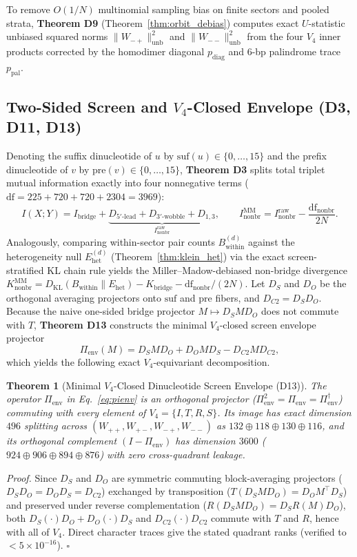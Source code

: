 \documentclass[11pt,a4paper]{article}
\newtheorem{theorem}{Theorem}
\newcommand{\Wpp}{W_{++}}
\newcommand{\Wpm}{W_{+-}}
\newcommand{\Wmp}{W_{-+}}
\newcommand{\Wmm}{W_{--}}
\newcommand{\Pienv}{\Pi_{\mathrm{env}}}
\newcommand{\Inb}{I_{\mathrm{nonbr}}^{\mathrm{MM}}}
\newcommand{\Inbraw}{I_{\mathrm{nonbr}}^{\mathrm{raw}}}
\begin{document}
\noindent To remove $O(1/N)$ multinomial sampling bias on finite sectors and pooled strata, \textbf{Theorem D9} (Theorem~\ref{thm:orbit_debias}) computes exact $U$-statistic unbiased squared norms $\|\Wmp\|^2_{\mathrm{unb}}$ and $\|\Wmm\|^2_{\mathrm{unb}}$ from the four $V_4$ inner products corrected by the homodimer diagonal $p_{\mathrm{diag}}$ and 6-bp palindrome trace $p_{\mathrm{pal}}$.

\subsection{Two-Sided Screen and $V_4$-Closed Envelope (D3, D11, D13)}
Denoting the suffix dinucleotide of $u$ by $\mathrm{suf}(u) \in \{0,\dots,15\}$ and the prefix dinucleotide of $v$ by $\mathrm{pre}(v) \in \{0,\dots,15\}$, \textbf{Theorem D3} splits total triplet mutual information exactly into four nonnegative terms ($\mathrm{df}=225+720+720+2304=3969$):
\begin{equation}
  I(X;Y) = I_{\mathrm{bridge}} + \underbrace{D_{5'\text{-lead}} + D_{3'\text{-wobble}} + D_{1,3}}_{\Inbraw}, \qquad
  \Inb = \Inbraw - \frac{\mathrm{df}_{\mathrm{nonbr}}}{2N}.
\end{equation}
Analogously, comparing within-sector pair counts $B_{\mathrm{within}}^{(d)}$ against the heterogeneity null $E_{\mathrm{het}}^{(d)}$ (Theorem~\ref{thm:klein_het}) via the exact screen-stratified KL chain rule yields the Miller--Madow-debiased non-bridge divergence $K_{\mathrm{nonbr}}^{\mathrm{MM}} = D_{\mathrm{KL}}(B_{\mathrm{within}}\|E_{\mathrm{het}}) - K_{\mathrm{bridge}} - \mathrm{df}_{\mathrm{nonbr}}/(2N)$.
Let $D_S$ and $D_O$ be the orthogonal averaging projectors onto $\mathrm{suf}$ and $\mathrm{pre}$ fibers, and $D_{C2} = D_S D_O$. Because the naive one-sided bridge projector $M \mapsto D_S M D_O$ does not commute with $T$, \textbf{Theorem D13} constructs the minimal $V_4$-closed screen envelope projector
\begin{equation}
  \Pienv(M) = D_S M D_O + D_O M D_S - D_{C2} M D_{C2},
  \label{eq:pienv}
\end{equation}
which yields the following exact $V_4$-equivariant decomposition.

\begin{theorem}[Minimal $V_4$-Closed Dinucleotide Screen Envelope (D13)]
\label{thm:pienv}
The operator $\Pienv$ in Eq.~\eqref{eq:pienv} is an orthogonal projector ($\Pienv^2 = \Pienv = \Pienv^\dagger$) commuting with every element of $V_4 = \{I,T,R,S\}$. Its image has exact dimension $496$ splitting across $(\Wpp,\Wpm,\Wmp,\Wmm)$ as $132 \oplus 118 \oplus 130 \oplus 116$, and its orthogonal complement $(I-\Pienv)$ has dimension $3600$ ($924 \oplus 906 \oplus 894 \oplus 876$) with zero cross-quadrant leakage.
\end{theorem}
\noindent\textit{Proof.} Since $D_S$ and $D_O$ are symmetric commuting block-averaging projectors ($D_S D_O = D_O D_S = D_{C2}$) exchanged by transposition ($T(D_S M D_O) = D_O M^\top D_S$) and preserved under reverse complementation ($R(D_S M D_O) = D_S R(M) D_O$), both $D_S(\cdot)D_O + D_O(\cdot)D_S$ and $D_{C2}(\cdot)D_{C2}$ commute with $T$ and $R$, hence with all of $V_4$. Direct character traces give the stated quadrant ranks (verified to $<5\times 10^{-16}$). $\square$
\end{document}
